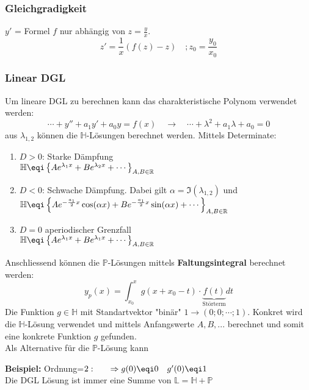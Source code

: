 \subsubsection{Gleichgradigkeit}
$y'$ = Formel $f$ nur abhängig von $z = \frac{y}{x}$. 
\[
z' = \frac{1}{x}(f(z) - z) \quad;z_0 = \frac{y_0}{x_0}\]


\subsubsection{Linear DGL}
Um lineare DGL zu berechnen kann das charakteristische Polynom verwendet werden:
\[
\cdots + y'' + a_1y' + a_0y = f(x) \quad\rightarrow\quad \cdots + \lambda^2 + a_1\lambda + a_0 = 0
\]
aus $\lambda_{1,2}$ können die $\mathbb{H}$-Lösungen berechnet werden. Mittels Determinate: 
\begin{enumerate}[nosep]
	\item $D>0$: Starke Dämpfung\\$\mathbb{H} \eqi \left\{Ae^{\lambda_1x}+Be^{\lambda_2x} + \cdots \right\}_{A,B \in \mathbb{R}}$
	\item $D<0$: Schwache Dämpfung. Dabei gilt $\alpha = \Im(\lambda_{1,2 }) $ und \\ $\mathbb{H} \eqi \left\{Ae^{-\frac{a_1}{2}x}\cos(\alpha x)+Be^{-\frac{a_1}{2}x}\sin(\alpha x) + \cdots \right\}_{A,B \in \mathbb{R}}$
	\item $D=0$ aperiodischer Grenzfall\\$\mathbb{H} \eqi \left\{Ae^{\lambda_1x}+Be^{\lambda_1x}  + \cdots \right\}_{A,B \in \mathbb{R}}$
\end{enumerate}

\noindent Anschliessend können die $\mathbb{P}$-Lösungen mittels \textbf{Faltungsintegral} berechnet werden:
\[
y_p(x) = \int_{x_0}^{x}g(x + x_0 - t)\cdot\underbrace{f(t)}_\text{Störterm}dt
\]
\noindent Die Funktion $g\in\mathbb{H}$ mit Standartvektor "binär" $1 \to (0;0;\cdots;1)$. Konkret wird die $\mathbb{H}$-Lösung verwendet und mittels Anfangswerte $A,B,...$ berechnet und somit eine konkrete Funktion $g$ gefunden.\\

\noindent Als Alternative für die $\mathbb{P}$-Lösung kann 

\noindent\textbf{Beispiel:} Ordnung=$2: \qquad \Rightarrow g(0) \eqi 0 \quad g'(0) \eqi 1$\\

\noindent Die DGL Lösung ist immer eine Summe von $\mathbb{L} = \mathbb{H} + \mathbb{P}$
